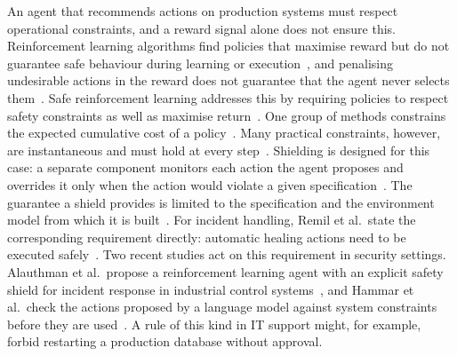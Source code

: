 An agent that recommends actions on production systems must respect operational constraints, and a reward signal alone does not ensure this. Reinforcement learning algorithms find policies that maximise reward but do not guarantee safe behaviour during learning or execution~\cite{alshiekh2018}, and penalising undesirable actions in the reward does not guarantee that the agent never selects them~\cite{konighofer2025}. Safe reinforcement learning addresses this by requiring policies to respect safety constraints as well as maximise return~\cite{garcia2015}. One group of methods constrains the expected cumulative cost of a policy~\cite{achiam2017,wachi2024}. Many practical constraints, however, are instantaneous and must hold at every step~\cite{zhao2023}. Shielding is designed for this case: a separate component monitors each action the agent proposes and overrides it only when the action would violate a given specification~\cite{alshiekh2018}. The guarantee a shield provides is limited to the specification and the environment model from which it is built~\cite{konighofer2025}. For incident handling, Remil et al.\ state the corresponding requirement directly: automatic healing actions need to be executed safely~\cite{remil2024}. Two recent studies act on this requirement in security settings. Alauthman et al.\ propose a reinforcement learning agent with an explicit safety shield for incident response in industrial control systems~\cite{alauthman2026}, and Hammar et al.\ check the actions proposed by a language model against system constraints before they are used~\cite{hammar2026llm}. A rule of this kind in IT support might, for example, forbid restarting a production database without approval.

